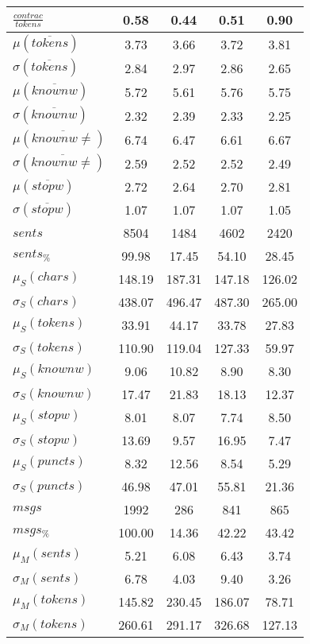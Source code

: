 \begin{table}[h!]
\begin{center}
\begin{tabular}{| l || c | c | c | c |}
$\frac{contrac}{tokens}$ & 0.58  & 0.44  & 0.51  & 0.90 \\\hline\hline
$\mu(\overline{tokens})$ & 3.73  & 3.66  & 3.72  & 3.81 \\
$\sigma(\overline{tokens})$ & 2.84  & 2.97  & 2.86  & 2.65 \\\hline
$\mu(\overline{knownw})$ & 5.72  & 5.61  & 5.76  & 5.75 \\
$\sigma(\overline{knownw})$ & 2.32  & 2.39  & 2.33  & 2.25 \\\hline
$\mu(\overline{knownw \neq})$ & 6.74  & 6.47  & 6.61  & 6.67 \\
$\sigma(\overline{knownw \neq})$ & 2.59  & 2.52  & 2.52  & 2.49 \\\hline
$\mu(\overline{stopw})$ & 2.72  & 2.64  & 2.70  & 2.81 \\
$\sigma(\overline{stopw})$ & 1.07  & 1.07  & 1.07  & 1.05 \\\hline\hline
$sents$ & 8504  & 1484  & 4602  & 2420 \\
$sents_{\%}$ & 99.98  & 17.45  & 54.10  & 28.45 \\\hline
$\mu_S(chars)$ & 148.19  & 187.31  & 147.18  & 126.02 \\
$\sigma_S(chars)$ & 438.07  & 496.47  & 487.30  & 265.00 \\\hline
$\mu_S(tokens)$ & 33.91  & 44.17  & 33.78  & 27.83 \\
$\sigma_S(tokens)$ & 110.90  & 119.04  & 127.33  & 59.97 \\\hline
$\mu_S(knownw)$ & 9.06  & 10.82  & 8.90  & 8.30 \\
$\sigma_S(knownw)$ & 17.47  & 21.83  & 18.13  & 12.37 \\\hline
$\mu_S(stopw)$ & 8.01  & 8.07  & 7.74  & 8.50 \\
$\sigma_S(stopw)$ & 13.69  & 9.57  & 16.95  & 7.47 \\\hline
$\mu_S(puncts)$ & 8.32  & 12.56  & 8.54  & 5.29 \\
$\sigma_S(puncts)$ & 46.98  & 47.01  & 55.81  & 21.36 \\\hline\hline
$msgs$ & 1992  & 286  & 841  & 865 \\
$msgs_{\%}$ & 100.00  & 14.36  & 42.22  & 43.42 \\\hline
$\mu_M(sents)$ & 5.21  & 6.08  & 6.43  & 3.74 \\
$\sigma_M(sents)$ & 6.78  & 4.03  & 9.40  & 3.26 \\\hline
$\mu_M(tokens)$ & 145.82  & 230.45  & 186.07  & 78.71 \\
$\sigma_M(tokens)$ & 260.61  & 291.17  & 326.68  & 127.13 \\\hline

\end{tabular}
\end{center}
\end{table}
